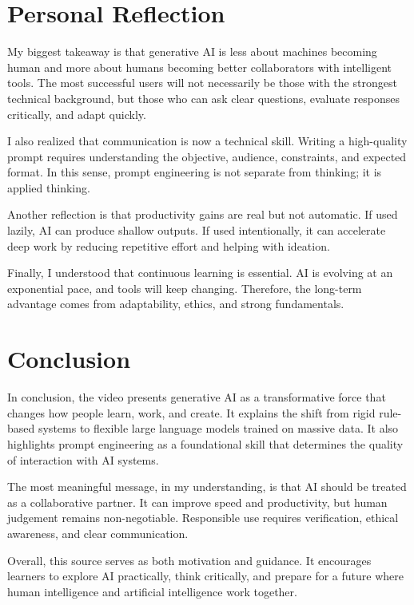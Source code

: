 \documentclass[12pt,a4paper]{article}
\begin{document}
\section*{Personal Reflection}
My biggest takeaway is that generative AI is less about machines becoming human and more about humans becoming better collaborators with intelligent tools. The most successful users will not necessarily be those with the strongest technical background, but those who can ask clear questions, evaluate responses critically, and adapt quickly.

I also realized that communication is now a technical skill. Writing a high-quality prompt requires understanding the objective, audience, constraints, and expected format. In this sense, prompt engineering is not separate from thinking; it is applied thinking.

Another reflection is that productivity gains are real but not automatic. If used lazily, AI can produce shallow outputs. If used intentionally, it can accelerate deep work by reducing repetitive effort and helping with ideation.

Finally, I understood that continuous learning is essential. AI is evolving at an exponential pace, and tools will keep changing. Therefore, the long-term advantage comes from adaptability, ethics, and strong fundamentals.

\section*{Conclusion}
In conclusion, the video presents generative AI as a transformative force that changes how people learn, work, and create. It explains the shift from rigid rule-based systems to flexible large language models trained on massive data. It also highlights prompt engineering as a foundational skill that determines the quality of interaction with AI systems.

The most meaningful message, in my understanding, is that AI should be treated as a collaborative partner. It can improve speed and productivity, but human judgement remains non-negotiable. Responsible use requires verification, ethical awareness, and clear communication.

Overall, this source serves as both motivation and guidance. It encourages learners to explore AI practically, think critically, and prepare for a future where human intelligence and artificial intelligence work together.
\end{document}

